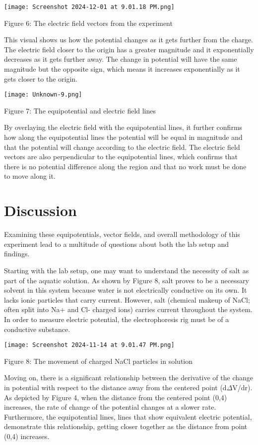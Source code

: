 \documentclass[conference]{IEEEtran}
\begin{document}
\begin{center}
    \texttt{[image: Screenshot 2024-12-01 at 9.01.18 PM.png]}
    
    Figure 6: The electric field vectors from the experiment
\end{center}
This visual shows us how the potential changes as it gets further from the charge. The electric field closer to the origin has a greater magnitude and it exponentially decreases as it gets further away. The change in potential will have the same magnitude but the opposite sign, which means it increases exponentially as it gets closer to the origin.
\begin{center}
    \texttt{[image: Unknown-9.png]}
    
    Figure 7: The equipotential and electric field lines 
\end{center}
By overlaying the electric field with the equipotential lines, it further confirms how along the equipotential lines the potential will be equal in magnitude and that the potential will change according to the electric field. The electric field vectors are also perpendicular to the equipotential lines, which confirms that there is no potential difference along the region and that no work must be done to move along it. 


\section{Discussion}
Examining these equipotentials, vector fields, and overall methodology of this experiment lead to a multitude of questions about both the lab setup and findings. 

Starting with the lab setup, one may want to understand the necessity of salt as part of the aquatic solution. As shown by Figure 8, salt proves to be a necessary solvent in this system because water is not electrically conductive on its own. It lacks ionic particles that carry current. However, salt (chemical makeup of NaCl; often split into Na+ and Cl- charged ions) carries current throughout the system. In order to measure electric potential, the electrophoresis rig must be of a conductive substance. 
\begin{center}
    \texttt{[image: Screenshot 2024-11-14 at 9.01.47 PM.png]}
    
    Figure 8: The movement of charged NaCl particles in solution 
\end{center}

Moving on, there is a significant relationship between the derivative of the change in potential with respect to the distance away from the centered point (d$\Delta$V/dr). As depicted by Figure 4, when the distance from the centered point (0,4) increases, the rate of change of the potential changes at a slower rate. Furthermore, the equipotential lines, lines that show equivalent electric potential, demonstrate this relationship, getting closer together as the distance from point (0,4) increases.
\end{document}
